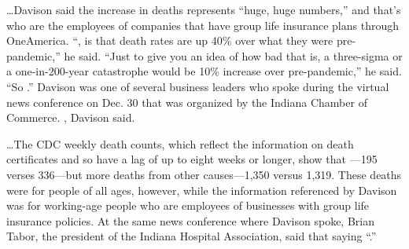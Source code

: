 \begin{refsection}
\begin{tcolorbox}[quote]
\dots{}Davison said the increase in deaths represents \enquote{huge, huge numbers,} and that's  who are the employees of companies that have group life insurance plans through OneAmerica. \enquote{, is that death rates are up 40\% over what they were pre-pandemic,} he said. \enquote{Just to give you an idea of how bad that is, a three-sigma or a one-in-200-year catastrophe would be 10\% increase over pre-pandemic,} he said. \enquote{So .} Davison was one of several business leaders who spoke during the virtual news conference on Dec. 30 that was organized by the Indiana Chamber of Commerce. , Davison said.\textsuperscript{\cite{url90n2ap92m}}

\end{tcolorbox}

\begin{tcolorbox}[quote]

\dots{}The CDC weekly death counts, which reflect the information on death certificates and so have a lag of up to eight weeks or longer, show that ---195 verses 336---but more deaths from other causes---1,350 versus 1,319. These deaths were for people of all ages, however, while the information referenced by Davison was for working-age people who are employees of businesses with group life insurance policies. At the same news conference where Davison spoke, Brian Tabor, the president of the Indiana Hospital Association, said that  saying \enquote{.}\textsuperscript{\cite{url90n2ap92m}}

\end{tcolorbox}

\begin{tcolorbox}[quote]


\end{tcolorbox}
\end{refsection}
